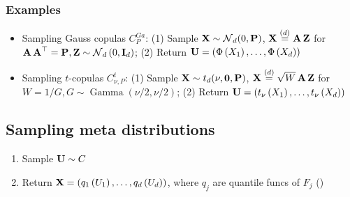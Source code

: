 \subsubsection*{Examples}
\begin{itemize}[leftmargin=*]
    \item Sampling Gauss copulas $C_{P}^{G a}$: 
(1) Sample $\X \sim \N_{d}(0, \vect{P})$, $\X \stackrel{(d)}{=} \A \Z$ for $\A \A^{\T}=\vect{P}, \Z \sim \N_{d}\left(0, \I_{d}\right)$; 
(2) Return $\U=\left(\Phi\left(X_{1}\right), \ldots, \Phi\left(X_{d}\right)\right)$
    \item Sampling $t$-copulas $C_{\nu, P}^{t}$: 
(1) Sample $\X \sim t_{d}(\nu, \0, \vect{P})$, $\X \stackrel{(d)}{=} \sqrt{W} \A \Z$ for $W=1 / G, G \sim \operatorname{Gamma}(\nu / 2, \nu / 2)$; 
(2) Return $\U=\left(t_{\nu}\left(X_{1}\right), \ldots, t_{\nu}\left(X_{d}\right)\right)$

\end{itemize}







\subsection*{Sampling meta distributions}
\begin{enumerate}[label = (\arabic*), leftmargin=*]
    \item Sample $\U \sim C$
    \item Return $\X=\left(q_{1}\left(U_{1}\right), \ldots, q_{d}\left(U_{d}\right)\right)$, where $q_{j}$ are quantile funcs of $F_{j}$ ()
\end{enumerate}








